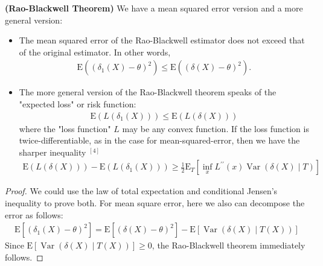 \documentclass{article}
\newcommand{\bfs}[1]{\textbf{({#1}) }}
\begin{document}
\begin{thma}\bfs{Rao-Blackwell Theorem}\label{thm:Rao_Blackwell} We have a mean squared error version and a more general version:
\begin{itemize}
    \item {}  The mean squared error of the Rao-Blackwell estimator does not exceed that of the original estimator.
In other words,
\begin{align*}
\mathrm{E}\left(\left(\delta_{1}(X)-\theta\right)^{2}\right) \leq \mathrm{E}\left((\delta(X)-\theta)^{2}\right) .
\end{align*}

\item {} The more general version of the Rao-Blackwell theorem speaks of the "expected loss" or risk function:
\begin{align*}
\mathrm{E}\left(L\left(\delta_{1}(X)\right)\right) \leq \mathrm{E}(L(\delta(X)))
\end{align*}
where the "loss function" $L$ may be any convex function. If the loss function is twice-differentiable, as in the case for mean-squared-error, then we have the sharper inequality ${ }^{[4]}$
\begin{align*}
\mathrm{E}(L(\delta(X)))-\mathrm{E}\left(L\left(\delta_{1}(X)\right)\right) \geq \frac{1}{2} \mathrm{E}_{T}\left[\inf _{x} L^{\prime \prime}(x) \operatorname{Var}(\delta(X) \mid T)\right]
\end{align*}
\end{itemize}
\end{thma}
\begin{proof}
We could use the law of total expectation and conditional Jensen’s inequality \cite[Theorem 4.1.10.]{durrett2019probability} to prove both. For mean square error, here we also can decompose the error as follows:
\begin{align*}
\mathrm{E}\left[\left(\delta_{1}(X)-\theta\right)^{2}\right]=\mathrm{E}\left[(\delta(X)-\theta)^{2}\right]-\mathrm{E}[\operatorname{Var}(\delta(X) \mid T(X))]
\end{align*}
Since $\mathrm{E}[\operatorname{Var}(\delta(X) \mid T(X))] \geq 0$, the Rao-Blackwell theorem immediately follows.
\end{proof}
\end{document}
